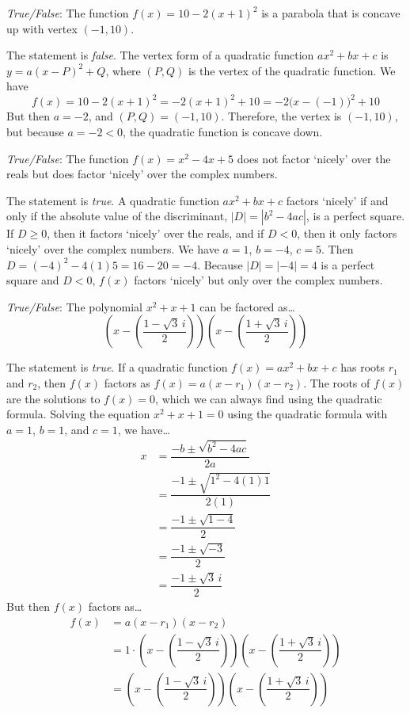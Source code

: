 \documentclass[11pt,letterpaper]{article}
\begin{document}
\quizsol \textit{True/False}: The function $f(x)= 10 - 2(x + 1)^2$ is a parabola that is concave up with vertex $(-1, 10)$. \pspace

\sol The statement is \textit{false}. The vertex form of a quadratic function $ax^2 + bx + c$ is $y= a(x - P)^2 + Q$, where $(P, Q)$ is the vertex of the quadratic function. We have
	\[
	f(x)= 10 - 2(x + 1)^2= -2(x + 1)^2 + 10= -2 \big(x - (-1) \big)^2 + 10
	\]
But then $a= -2$, and $(P, Q)= (-1, 10)$. Therefore, the vertex is $(-1, 10)$, but because $a= -2 < 0$, the quadratic function is concave down. 



\newpage



\quizsol \textit{True/False}: The function $f(x)= x^2 - 4x + 5$ does not factor `nicely' over the reals but does factor `nicely' over the complex numbers. \pspace

\sol The statement is \textit{true}. A quadratic function $ax^2 + bx + c$ factors `nicely' if and only if the absolute value of the discriminant, $|D|= |b^2 - 4ac|$, is a perfect square. If $D \geq 0$, then it factors `nicely' over the reals, and if $D < 0$, then it only factors `nicely' over the complex numbers. We have $a= 1$, $b= -4$, $c= 5$. Then $D= (-4)^2 - 4(1)5= 16 - 20= -4$. Because $|D|= |-4|= 4$ is a perfect square and $D < 0$, $f(x)$ factors `nicely' but only over the complex numbers. \pvspace{1.5cm}



\quizsol \textit{True/False}: The polynomial $x^2 + x + 1$ can be factored as\dots
	\[
	\left( x - \left( \dfrac{1 - \sqrt{3}\,i}{2} \right) \right) \left( x - \left( \dfrac{1 + \sqrt{3}\,i}{2} \right) \right)
	\] \pspace

\sol The statement is \textit{true}. If a quadratic function $f(x)= ax^2 + bx + c$ has roots $r_1$ and $r_2$, then $f(x)$ factors as $f(x)= a(x - r_1)(x - r_2)$. The roots of $f(x)$ are the solutions to $f(x)= 0$, which we can always find using the quadratic formula. Solving the equation $x^2 + x + 1= 0$ using the quadratic formula with $a= 1$, $b= 1$, and $c= 1$, we have\dots
	\[
	\begin{aligned}
	x&= \dfrac{-b \pm \sqrt{b^2 - 4ac}}{2a} \\[0.3cm]
	&= \dfrac{-1 \pm \sqrt{1^2 - 4(1)1}}{2(1)} \\[0.3cm]
	&= \dfrac{-1 \pm \sqrt{1 - 4}}{2} \\[0.3cm]
	&= \dfrac{-1 \pm \sqrt{-3}}{2} \\[0.3cm]
	&= \dfrac{-1 \pm \sqrt{3}\,i}{2}
	\end{aligned}
	\]
But then $f(x)$ factors as\dots
	\[
	\begin{aligned}
	f(x)&= a(x - r_1)(x - r_2) \\[0.3cm]
	&= 1 \cdot \left( x - \left( \dfrac{1 - \sqrt{3}\,i}{2} \right) \right) \left( x - \left( \dfrac{1 + \sqrt{3}\,i}{2} \right) \right) \\[0.3cm]
	&= \left( x - \left( \dfrac{1 - \sqrt{3}\,i}{2} \right) \right) \left( x - \left( \dfrac{1 + \sqrt{3}\,i}{2} \right) \right)
	\end{aligned}
	\]
\end{document}
